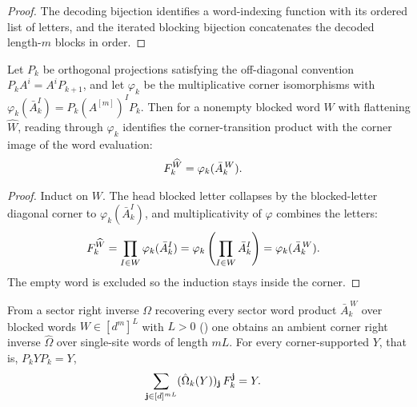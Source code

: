 \begin{proof}\leanok
    The decoding bijection identifies a word-indexing function with its ordered
    list of letters, and the iterated blocking bijection concatenates the
    decoded length-$m$ blocks in order.
\end{proof}

\begin{lemma}
    \label{lem:periodic_cornerprod_flatten}
    \leanok
    Let $P_k$ be orthogonal projections satisfying the off-diagonal convention
    $P_kA^i=A^iP_{k+1}$, and let $\varphi_k$ be the multiplicative corner
    isomorphisms with $\varphi_k(\bar A_k^I)=P_k(A^{[m]})^IP_k$. Then for a
    nonempty blocked word $W$ with flattening $\widehat W$, reading
    \cite[eq.~Fu]{DeLasCuevas2017Irreducible} through $\varphi_k$ identifies
    the corner-transition product with the corner image of the word evaluation:
    \begin{align}
        F_k^{\widehat W}
         & =
        \varphi_k(\bar A_k^{\,W}).
        \notag
    \end{align}
\end{lemma}

\begin{proof}\leanok
    Induct on $W$. The head blocked letter collapses by the blocked-letter
    diagonal corner to $\varphi_k(\bar A_k^I)$, and multiplicativity of
    $\varphi$ combines the letters:
    \begin{align}
        F_k^{\widehat W}
         & =
        \prod_{I\in W}\varphi_k(\bar A_k^I)
        =
        \varphi_k\left(\prod_{I\in W}\bar A_k^I\right)
        =
        \varphi_k(\bar A_k^{\,W}).
        \notag
    \end{align}
    The empty word is excluded so the induction stays inside the corner.
\end{proof}

\begin{lemma}
    \label{lem:periodic_ambient_corner_inverse}
    \leanok
    From a sector right inverse $\Omega$ recovering every sector word product
    $\bar A_k^{\,W}$ over blocked words $W\in[d^m]^L$ with $L>0$
    (\cite[eq.~Omegauprop]{DeLasCuevas2017Irreducible}) one obtains an ambient
    corner right inverse $\hat\Omega$ over single-site words of length $mL$.
    For every corner-supported $Y$, that is, $P_kYP_k=Y$,
    \begin{align}
        \sum_{\mathbf j\in[d]^{mL}}
        (\hat\Omega_k(Y))_{\mathbf j}\,F_k^{\mathbf j}
         & =
        Y.
        \notag
    \end{align}
\end{lemma}

